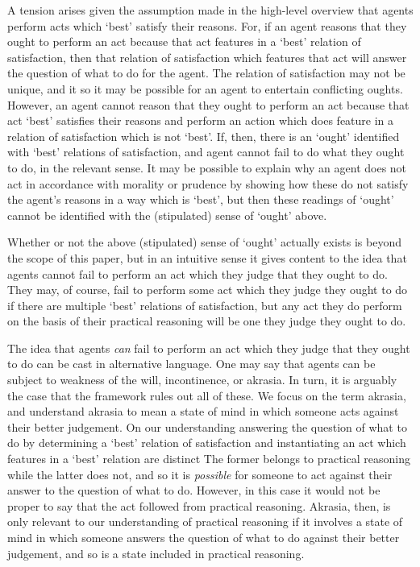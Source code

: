 \documentclass[10pt]{article}
\newcounter{subsubsubsection}[subsubsection]
\begin{document}
\label{sec:akrasia-1}

A tension arises given the assumption made in the high-level overview that agents perform acts which `best' satisfy their reasons.
For, if an agent reasons that they ought to perform an act because that act features in a `best' relation of satisfaction, then that relation of satisfaction which features that act will answer the question of what to do for the agent.
The relation of satisfaction may not be unique, and it so it may be possible for an agent to entertain conflicting oughts.
However, an agent cannot reason that they ought to perform an act because that act `best' satisfies their reasons and perform an action which does feature in a relation of satisfaction which is not `best'.
If, then, there is an `ought' identified with `best' relations of satisfaction, and agent cannot fail to do what they ought to do, in the relevant sense.
It may be possible to explain why an agent does not act in accordance with morality or prudence by showing how these do not satisfy the agent's reasons in a way which is `best', but then these readings of `ought' cannot be identified with the (stipulated) sense of `ought' above.

Whether or not the above (stipulated) sense of `ought' actually exists is beyond the scope of this paper, but in an intuitive sense it gives content to the idea that agents cannot fail to perform an act which they judge that they ought to do.
They may, of course, fail to perform some act which they judge they ought to do if there are multiple `best' relations of satisfaction, but any act they do perform on the basis of their practical reasoning will be one they judge they ought to do.

The idea that agents \emph{can} fail to perform an act which they judge that they ought to do can be cast in alternative language.
One may say that agents can be subject to weakness of the will, incontinence, or akrasia.
In turn, it is arguably the case that the framework rules out all of these.
We focus on the term akrasia, and understand akrasia to mean a state of mind in which someone acts against their better judgement.
On our understanding answering the question of what to do by determining a `best' relation of satisfaction and instantiating an act which features in a `best' relation are distinct
The former belongs to practical reasoning while the latter does not, and so it is \emph{possible} for someone to act against their answer to the question of what to do.
However, in this case it would not be proper to say that the act followed from practical reasoning.
Akrasia, then, is only relevant to our understanding of practical reasoning if it involves a state of mind in which someone answers the question of what to do against their better judgement, and so is a state included in practical reasoning.
\end{document}
